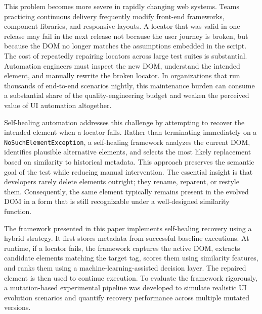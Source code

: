 \documentclass[conference]{IEEEtran}
\begin{document}
This problem becomes more severe in rapidly changing web systems. Teams practicing continuous delivery frequently modify front-end frameworks, component libraries, and responsive layouts. A locator that was valid in one release may fail in the next release not because the user journey is broken, but because the DOM no longer matches the assumptions embedded in the script. The cost of repeatedly repairing locators across large test suites is substantial. Automation engineers must inspect the new DOM, understand the intended element, and manually rewrite the broken locator. In organizations that run thousands of end-to-end scenarios nightly, this maintenance burden can consume a substantial share of the quality-engineering budget and weaken the perceived value of UI automation altogether.

Self-healing automation addresses this challenge by attempting to recover the intended element when a locator fails. Rather than terminating immediately on a \texttt{NoSuchElementException}, a self-healing framework analyzes the current DOM, identifies plausible alternative elements, and selects the most likely replacement based on similarity to historical metadata. This approach preserves the semantic goal of the test while reducing manual intervention. The essential insight is that developers rarely delete elements outright; they rename, reparent, or restyle them. Consequently, the same element typically remains present in the evolved DOM in a form that is still recognizable under a well-designed similarity function.

The framework presented in this paper implements self-healing recovery using a hybrid strategy. It first stores metadata from successful baseline executions. At runtime, if a locator fails, the framework captures the active DOM, extracts candidate elements matching the target tag, scores them using similarity features, and ranks them using a machine-learning-assisted decision layer. The repaired element is then used to continue execution. To evaluate the framework rigorously, a mutation-based experimental pipeline was developed to simulate realistic UI evolution scenarios and quantify recovery performance across multiple mutated versions.
\end{document}
